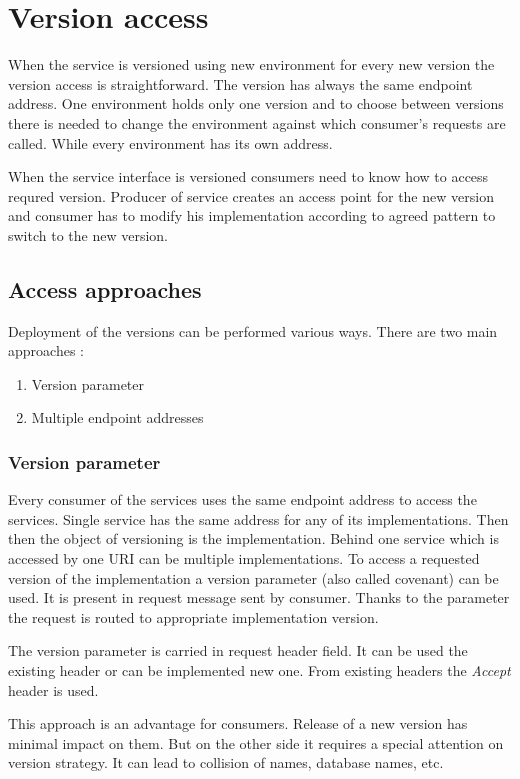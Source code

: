 \chapter{Version access}
\label{chap:versionaccess}

When the service is versioned using new environment for every new version the version access is straightforward. The version has always the same endpoint address. One environment holds only one version and to choose between versions there is needed to change the environment against which consumer's requests are called. While every environment has its own address.

When the service interface is versioned consumers need to know how to access requred version. Producer of service creates an access point for the new version and consumer has to modify his implementation according to agreed pattern to switch to the new version. 

\section{Access approaches}
Deployment of the versions can be performed various ways. There are two main approaches \cite{applied-soa}:
\begin{enumerate}
  \item Version parameter
  \item Multiple endpoint addresses
\end{enumerate}

\subsection{Version parameter}
Every consumer of the services uses the same endpoint address to access the services. Single service has the same address for any of its implementations. Then then the object of versioning is the implementation. Behind one service which is accessed by one URI can be multiple implementations.
To access a requested version of the implementation a version parameter (also called covenant) can be used. It is present in request message sent by consumer. Thanks to the parameter the request is routed to appropriate implementation version.


The version parameter is carried in request header field. It can be used the existing header or can be implemented new one. From existing headers the \emph{Accept} header is used.


This approach is an advantage for consumers. Release of a new version has minimal impact on them. But on the other side it requires a special attention on version strategy. It can lead to collision of names, database names, etc.



